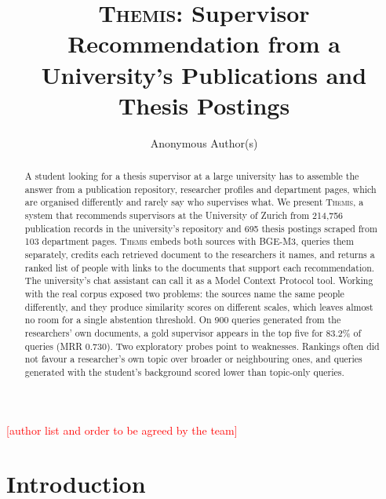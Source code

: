 \documentclass[sigconf,nonacm]{acmart}
\newcommand{\TODO}[1]{\textcolor{red}{[#1]}}
\newcommand{\sys}{\textsc{Themis}}
\begin{document}
\title{\sys: Supervisor Recommendation from a University's Publications and Thesis Postings}

\author{Anonymous Author(s)}

\begin{abstract}
A student looking for a thesis supervisor at a large university has to assemble the answer from a publication repository, researcher profiles and department pages, which are organised differently and rarely say who supervises what. We present \sys{}, a system that recommends supervisors at the University of Zurich from 214,756 publication records in the university's repository and 695 thesis postings scraped from 103 department pages. \sys{} embeds both sources with BGE-M3, queries them separately, credits each retrieved document to the researchers it names, and returns a ranked list of people with links to the documents that support each recommendation. The university's chat assistant can call it as a Model Context Protocol tool. Working with the real corpus exposed two problems: the sources name the same people differently, and they produce similarity scores on different scales, which leaves almost no room for a single abstention threshold. On 900 queries generated from the researchers' own documents, a gold supervisor appears in the top five for 83.2\% of queries (MRR 0.730). Two exploratory probes point to weaknesses. Rankings often did not favour a researcher's own topic over broader or neighbouring ones, and queries generated with the student's background scored lower than topic-only queries.
\end{abstract}



\maketitle
\noindent\TODO{author list and order to be agreed by the team}

\section{Introduction}
\end{document}
